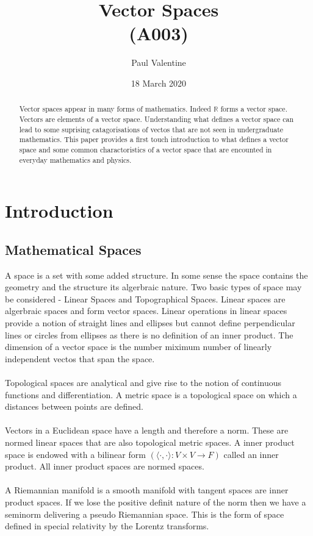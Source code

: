 \documentclass[a4paper]{article}
\title{\textbf{Vector Spaces}\\(A003)}
\author{Paul Valentine}
\date{18 March 2020}
\begin{document}
\maketitle
\begin{abstract}
  Vector spaces appear in many forms of mathematics. Indeed $\mathbb{R}$ forms a vector space. Vectors are elements of a vector space. Understanding what defines a vector space can lead to some suprising catagorisations of vectos that are not seen in undergraduate mathematics. This paper provides a first touch introduction to what defines a vector space and some common charactoristics of a vector space that are encounted in everyday mathematics and physics.
\end{abstract}
\section{Introduction}
\subsection{Mathematical Spaces}
A space is a set with some added structure. In some sense the space contains the geometry and the structure its algerbraic nature. Two basic types of space may be considered - Linear Spaces and Topographical Spaces. Linear spaces are algerbraic spaces and form vector spaces. Linear operations in linear spaces provide a notion of straight lines and ellipses but cannot define perpendicular lines or circles from ellipses as there is no definition of an inner product\cite{A004}. The dimension of a vector space is the number miximum number of linearly independent vectos that span the space.\\ \\
Topological spaces are analytical and give rise to the notion of continuous functions and differentiation. A metric space is a topological space on which a distances between points are defined.\\ \\
Vectors in a Euclidean space have a length and therefore a norm. These are normed linear spaces that are also topological metric spaces. A inner product space is endowed with a bilinear form $(\langle \cdot, \cdot \rangle : V \times V \to F)$\cite{A004} called an inner product. All inner product spaces are normed spaces. \\ \\
A Riemannian manifold is a smooth manifold with tangent spaces are inner product spaces. If we lose the positive definit nature of the norm then we have a seminorm delivering a pseudo Riemannian space. This is the form of space defined in special relativity by the Lorentz transforms.
\end{document}
